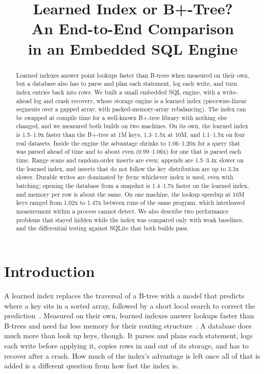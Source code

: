 \documentclass[conference]{IEEEtran}
\begin{document}
\title{Learned Index or B+-Tree?\\
An End-to-End Comparison\\
in an Embedded SQL Engine}

\author{}

\maketitle

\begin{abstract}
Learned indexes answer point lookups faster than B-trees when measured on
their own, but a database also has to parse and plan each statement, log each
write, and turn index entries back into rows. We built a small embedded SQL
engine, with a write-ahead log and crash recovery, whose storage engine is a
learned index (piecewise-linear segments over a gapped array, with
packed-memory-array rebalancing). The index can be swapped at compile time for a
well-known B+-tree library with nothing else changed, and we measured both builds
on two machines. On its own, the learned index is 1.5--1.9x
faster than the B+-tree at 1M keys, 1.3--1.5x at 10M, and 1.1--1.5x on four
real datasets. Inside the engine the advantage shrinks to 1.06--1.20x for a
query that was parsed ahead of time and to about even (0.99--1.06x) for one
that is parsed each time. Range scans and random-order inserts are even;
appends are 1.5--3.4x slower on the learned index, and inserts that do not
follow the key distribution are up to 3.3x slower. Durable writes are
dominated by fsync whichever index is used, even with batching; opening the
database from a snapshot is 1.4--1.7x faster on the learned index, and memory
per row is about the same. On one machine, the lookup speedup at 10M keys
ranged from 1.02x to 1.47x between runs of the same program, which interleaved
measurement within a process cannot detect. We also describe two performance
problems that stayed hidden while the index was compared only with weak
baselines, and the differential testing against SQLite that both builds pass.
\end{abstract}

\section{Introduction}

A learned index replaces the traversal of a B-tree with a model that
predicts where a key sits in a sorted array, followed by a short local
search to correct the prediction~\cite{kraska2018}. Measured on their own,
learned indexes answer lookups faster than B-trees and need far less memory
for their routing structure~\cite{marcus2020}. A database does much more
than look up keys, though. It parses and plans each statement, logs each
write before applying it, copies rows in and out of its storage, and has to
recover after a crash. How much of the index's advantage is left once all of
that is added is a different question from how fast the index is.
\end{document}
